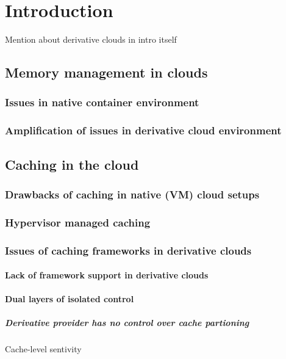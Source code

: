 \chapter{Introduction}
  
  Mention about derivative clouds in intro itself
  
  \section{Memory management in clouds}
     
    \subsection{Issues in native container environment}	
    \subsection{Amplification of issues in derivative cloud environment}
  
  \section{Caching in the cloud}
  
   \subsection{Drawbacks of caching in native (VM) cloud setups}
  
   \subsection{Hypervisor managed caching}
      
    \subsection{Issues of caching frameworks in derivative clouds}
      \subsubsection{Lack of framework support in derivative clouds}
      \subsubsection{Dual layers of isolated control}	
	 \paragraph{Derivative provider has no control over cache partioning}
	    Cache-level sentivity
